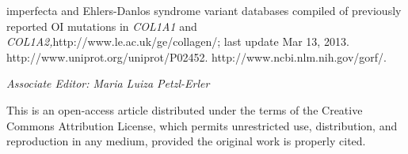 \begin{biblio}
imperfecta and Ehlers-Danlos syndrome variant databases compiled of previously reported OI mutations in \textit{COL1A1} and \textit{COL1A2,}http://www.le.ac.uk/ge/collagen/; last update Mar 13, 2013.
 http://www.uniprot.org/uniprot/P02452.
 http://www.ncbi.nlm.nih.gov/gorf/.
\end{biblio}

\medskip\par\noindent
\begin{flushright}\footnotesize{\par \textit{Associate Editor: Maria Luiza Petzl-Erler}
}\end{flushright}

\medskip\par\noindent
\footnotesize{This is an open-access article distributed under the terms of the Creative Commons Attribution License, which permits unrestricted use, distribution, and reproduction in any medium, provided the original work is properly cited.}
